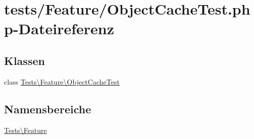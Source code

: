 \hypertarget{ObjectCacheTest_8php}{}\section{tests/\+Feature/\+Object\+Cache\+Test.php-\/\+Dateireferenz}
\label{ObjectCacheTest_8php}
\subsection*{Klassen}
\begin{DoxyCompactItemize}
\item 
class \hyperlink{classTests_1_1Feature_1_1ObjectCacheTest}{Tests\textbackslash{}\+Feature\textbackslash{}\+Object\+Cache\+Test}
\end{DoxyCompactItemize}
\subsection*{Namensbereiche}
\begin{DoxyCompactItemize}
\item 
 \hyperlink{namespaceTests_1_1Feature}{Tests\textbackslash{}\+Feature}
\end{DoxyCompactItemize}
